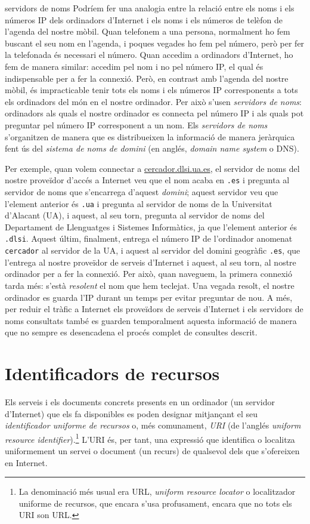 \begin{persabermes}{servidors de noms}
  Podríem fer una analogia entre la relació entre els noms i els
  números IP dels ordinadors d'Internet i els noms i els números de
  telèfon de l'agenda del nostre mòbil. Quan telefonem a una persona,
  normalment ho fem buscant el seu nom en l'agenda, i poques vegades
  ho fem pel número, però per fer la telefonada és necessari el
  número. Quan accedim a ordinadors d'Internet, ho fem de manera
  similar: accedim pel nom i no pel número IP, el qual és
  indispensable per a fer la connexió. Però, en contrast amb l'agenda
  del nostre mòbil, és impracticable tenir tots els noms i els números
  IP corresponents a tots els ordinadors del món en el nostre
  ordinador. Per això s'usen \emph{servidors de noms}: ordinadors als
  quals el nostre ordinador es connecta pel número IP i als quals pot
  preguntar pel número IP corresponent a un nom. Els \emph{servidors de
    noms} s'organitzen de manera que es distribueixen la informació de
  manera jeràrquica fent ús del \emph{sistema de noms de domini} (en
  anglés, \emph{domain name system} o DNS). 

  Per exemple, quan volem connectar a \url{cercador.dlsi.ua.es}, el
  servidor de noms del nostre proveïdor d'accés a Internet veu que el
  nom acaba en \texttt{.es} i pregunta al servidor de noms que
  s'encarrega d'aquest \emph{domini}; aquest servidor veu que
  l'element anterior és \texttt{.ua} i pregunta al servidor de noms de
  la Universitat d'Alacant (UA), i aquest, al seu torn, pregunta al
  servidor de noms del Departament de Llenguatges i Sistemes
  Informàtics, ja que l'element anterior és \texttt{.dlsi}. Aquest
  últim, finalment, entrega el número IP de l'ordinador anomenat
  \texttt{cercador} al servidor de la UA, i aquest al servidor del
  domini geogràfic \texttt{.es}, que l'entrega al nostre proveïdor de
  serveis d'Internet i aquest, al seu torn, al nostre ordinador per a
  fer la connexió. Per això, quan naveguem, la primera connexió tarda
  més: s'està \emph{resolent} el nom que hem teclejat. Una vegada
  resolt, el nostre ordinador es guarda l'IP durant un temps per
  evitar preguntar de nou. A més, per reduir el tràfic a Internet els
  proveïdors de serveis d'Internet i els servidors de noms consultats
  també es guarden temporalment aquesta informació de manera que no
  sempre es desencadena el procés complet de consultes descrit.
\end{persabermes}

\section{Identificadors de recursos}
Els serveis i els documents concrets presents en un ordinador (un
servidor d'Internet) que els fa disponibles es poden designar
mitjançant el seu \emph{identificador uniforme de recursos} o, més
comunament, \emph{URI} (de l'anglés \emph{uniform resource
  identifier}).\footnote{La denominació més usual era URL,
  \emph{uniform resource locator} o localitzador uniforme de recursos,
  que encara s'usa profusament, encara que no tots els URI son URL.}
L'URI és, per tant, una expressió que identifica o localitza
uniformement un servei o document (un recurs) de qualsevol dels que
s'ofereixen en Internet.

